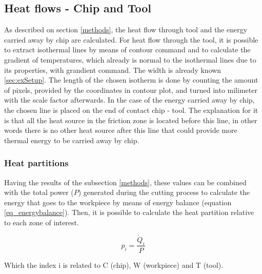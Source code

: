 	\subsection{Heat flows - Chip and Tool}
	\label{heatflows}
	As described on section \ref{methods}, the heat flow through tool and the energy carried away by chip are calculated. For heat flow through the tool, it is possible to extract isothermal lines by means of contour command and to calculate the gradient of temperatures, which already is normal to the isothermal lines due to its properties, with grandient command. The width is already known \ref{sec:exSetup}. The length of the chosen isotherm is done by counting the amount of pixels, provided by the coordinates in contour plot, and turned into milimeter with the scale factor afterwards.
	In the case of the energy carried away by chip, the chosen line is placed on the end of contact chip - tool. The explanation for it is that all the heat source in the friction zone is located before this line, in other words there is no other heat source after this line that could provide more thermal energy to be carried away by chip.		

		\subsubsection{Heat partitions}
		Having the results of the subsection \ref{methods}, these values can be combined with the total power ($P$) generated during the cutting process to calculate the energy that goes to the workpiece by means of energy balance (equation \ref{eq_energybalance}). Then, it is possible to calculate the heat partition relative to each zone of interest.

		\begin{equation} 
		\label{eq_heatpartition}
		p_{i} = \frac{\dot{Q}_{i}}{P}
		\end{equation}

		Which the index i is related to C (chip), W (workpiece) and T (tool).
	
